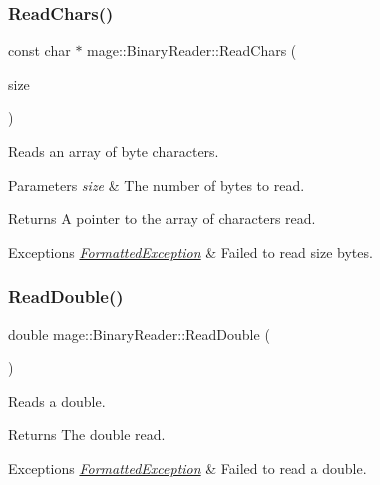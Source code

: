\subsubsection{\texorpdfstring{Read\+Chars()}{ReadChars()}}
{\footnotesize\ttfamily const char $\ast$ mage\+::\+Binary\+Reader\+::\+Read\+Chars (\begin{DoxyParamCaption}\item[{size\+\_\+t}]{size }\end{DoxyParamCaption})\hspace{0.3cm}{\ttfamily [protected]}}

Reads an array of byte characters.


\begin{DoxyParams}{Parameters}
{\em size} & The number of bytes to read. \\
\hline
\end{DoxyParams}
\begin{DoxyReturn}{Returns}
A pointer to the array of characters read. 
\end{DoxyReturn}

\begin{DoxyExceptions}{Exceptions}
{\em \hyperlink{structmage_1_1_formatted_exception}{Formatted\+Exception}} & Failed to read {\ttfamily size} bytes. \\
\hline
\end{DoxyExceptions}
\hypertarget{classmage_1_1_binary_reader_aa9d54a457a85d6f488d818c0a3e56560}{}\label{classmage_1_1_binary_reader_aa9d54a457a85d6f488d818c0a3e56560} 
\subsubsection{\texorpdfstring{Read\+Double()}{ReadDouble()}}
{\footnotesize\ttfamily double mage\+::\+Binary\+Reader\+::\+Read\+Double (\begin{DoxyParamCaption}{ }\end{DoxyParamCaption})\hspace{0.3cm}{\ttfamily [protected]}}

Reads a {\ttfamily double}.

\begin{DoxyReturn}{Returns}
The {\ttfamily double} read. 
\end{DoxyReturn}

\begin{DoxyExceptions}{Exceptions}
{\em \hyperlink{structmage_1_1_formatted_exception}{Formatted\+Exception}} & Failed to read a {\ttfamily double}. \\
\hline
\end{DoxyExceptions}
\hypertarget{classmage_1_1_binary_reader_af18ab2185b7c766c2183ab54f4676d57}{}\label{classmage_1_1_binary_reader_af18ab2185b7c766c2183ab54f4676d57} 
